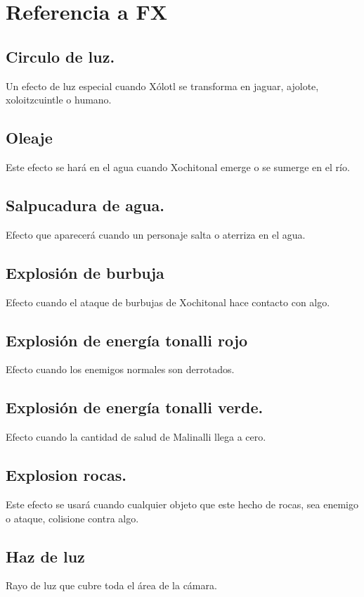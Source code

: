 \chapter{Referencia a FX}
\section{Circulo de luz.} \label{FX:CirLuz}
Un efecto de luz especial cuando Xólotl se transforma en jaguar, ajolote, xoloitzcuintle o humano.
\section{Oleaje}\label{FX:Oleaje}
Este efecto se hará en el agua cuando Xochitonal emerge o se sumerge en el río.
\section{Salpucadura de agua.} \label{FX:SalAgua}
Efecto que aparecerá cuando un personaje salta o aterriza en el agua.
\section{Explosión de burbuja}\label{FX:ExpAgua}
Efecto cuando el ataque de burbujas de Xochitonal hace contacto con algo.
\section{Explosión de energía tonalli rojo} \label{FX:ExpTonR}
Efecto cuando los enemigos normales son derrotados.
\section{Explosión de energía tonalli verde.} \label{FX:ExpTonV}
 Efecto cuando la cantidad de salud de Malinalli llega a cero.
\section{Explosion rocas.} \label{FX:ExpRoc}
Este efecto se usará cuando cualquier objeto que este hecho de rocas, sea enemigo o ataque, colisione contra algo.
\section{Haz de luz} \label{FX:HazLuz}
Rayo de luz que cubre toda el área de la cámara. 
